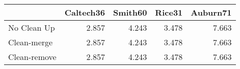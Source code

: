 \begin{tabular}{lrrrr}
\toprule
{} & Caltech36 & Smith60 & Rice31 & Auburn71 \\
\midrule
No Clean Up  &     2.857 &   4.243 &  3.478 &    7.663 \\
Clean-merge  &     2.857 &   4.243 &  3.478 &    7.663 \\
Clean-remove &     2.857 &   4.243 &  3.478 &    7.663 \\
\bottomrule
\end{tabular}
